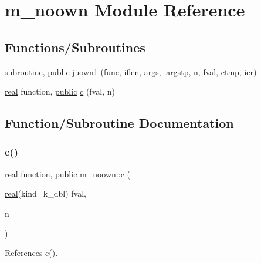 \hypertarget{namespacem__noown}{}\section{m\+\_\+noown Module Reference}
\label{namespacem__noown}
\subsection*{Functions/\+Subroutines}
\begin{DoxyCompactItemize}
\item 
\hyperlink{M__stopwatch_83_8txt_acfbcff50169d691ff02d4a123ed70482}{subroutine}, \hyperlink{M__stopwatch_83_8txt_a2f74811300c361e53b430611a7d1769f}{public} \hyperlink{namespacem__noown_a9621366886f977a10fd7804c91054c6d}{juown1} (func, iflen, args, iargstp, n, fval, ctmp, ier)
\item 
\hyperlink{read__watch_83_8txt_abdb62bde002f38ef75f810d3a905a823}{real} function, \hyperlink{M__stopwatch_83_8txt_a2f74811300c361e53b430611a7d1769f}{public} \hyperlink{namespacem__noown_ad499ba6364622c755e4ad04bc2bfa4a3}{c} (fval, n)
\end{DoxyCompactItemize}


\subsection{Function/\+Subroutine Documentation}
\mbox{\label{namespacem__noown_ad499ba6364622c755e4ad04bc2bfa4a3}} 
\subsubsection{\texorpdfstring{c()}{c()}}
{\footnotesize\ttfamily \hyperlink{read__watch_83_8txt_abdb62bde002f38ef75f810d3a905a823}{real} function, \hyperlink{M__stopwatch_83_8txt_a2f74811300c361e53b430611a7d1769f}{public} m\+\_\+noown\+::c (\begin{DoxyParamCaption}\item[{\hyperlink{read__watch_83_8txt_abdb62bde002f38ef75f810d3a905a823}{real}(kind=k\+\_\+dbl)}]{fval,  }\item[{}]{n }\end{DoxyParamCaption})}



References c().

\mbox{\label{namespacem__noown_a9621366886f977a10fd7804c91054c6d}} 
